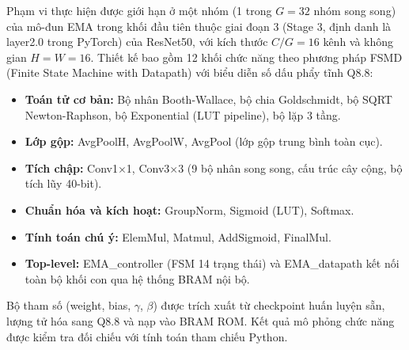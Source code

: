 \documentclass{uetgraduation}
\begin{document}
Phạm vi thực hiện được giới hạn ở một nhóm (1 trong $G = 32$ nhóm song song) của
mô-đun EMA trong khối đầu tiên thuộc giai đoạn 3 (Stage 3, định danh là layer2.0 trong PyTorch) của ResNet50, với kích thước $C/G = 16$ kênh và
không gian $H = W = 16$. Thiết kế bao gồm 12 khối chức năng theo phương pháp
FSMD (Finite State Machine with Datapath) với biểu diễn số dấu phẩy tĩnh Q8.8:
\begin{itemize}
    \item \textbf{Toán tử cơ bản:} Bộ nhân Booth-Wallace, bộ chia Goldschmidt,
    bộ SQRT Newton-Raphson, bộ Exponential (LUT pipeline), bộ lặp 3 tầng.
    \item \textbf{Lớp gộp:} AvgPoolH, AvgPoolW, AvgPool (lớp gộp trung bình toàn cục).
    \item \textbf{Tích chập:} Conv1$\times$1, Conv3$\times$3 (9 bộ nhân song song,
    cấu trúc cây cộng, bộ tích lũy 40-bit).
    \item \textbf{Chuẩn hóa và kích hoạt:} GroupNorm, Sigmoid (LUT), Softmax.
    \item \textbf{Tính toán chú ý:} ElemMul, Matmul, AddSigmoid, FinalMul.
    \item \textbf{Top-level:} EMA\_controller (FSM 14 trạng thái) và EMA\_datapath
    kết nối toàn bộ khối con qua hệ thống BRAM nội bộ.
\end{itemize}

Bộ tham số (weight, bias, $\gamma$, $\beta$) được trích xuất từ checkpoint
huấn luyện sẵn, lượng tử hóa sang Q8.8 và nạp vào BRAM ROM. Kết quả mô phỏng
chức năng được kiểm tra đối chiếu với tính toán tham chiếu Python.
\end{document}
